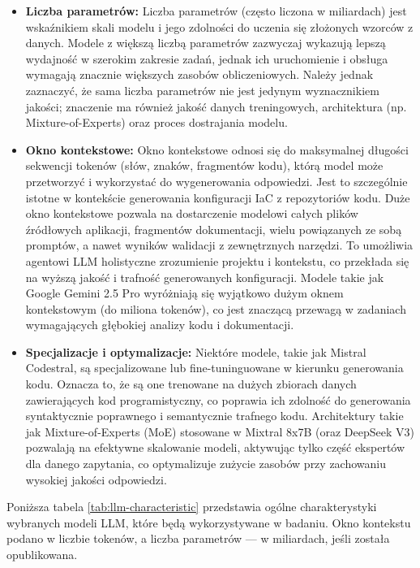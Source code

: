 \begin{itemize}
    \item \textbf{Liczba parametrów:} Liczba parametrów (często liczona w miliardach) jest wskaźnikiem skali modelu i jego zdolności do uczenia się złożonych wzorców z danych. Modele z większą liczbą parametrów zazwyczaj wykazują lepszą wydajność w szerokim zakresie zadań, jednak ich uruchomienie i obsługa wymagają znacznie większych zasobów obliczeniowych. Należy jednak zaznaczyć, że sama liczba parametrów nie jest jedynym wyznacznikiem jakości; znaczenie ma również jakość danych treningowych, architektura (np. Mixture-of-Experts) oraz proces dostrajania modelu.
    \item \textbf{Okno kontekstowe:} Okno kontekstowe odnosi się do maksymalnej długości sekwencji tokenów (słów, znaków, fragmentów kodu), którą model może przetworzyć i wykorzystać do wygenerowania odpowiedzi. Jest to szczególnie istotne w kontekście generowania konfiguracji IaC z repozytoriów kodu. Duże okno kontekstowe pozwala na dostarczenie modelowi całych plików źródłowych aplikacji, fragmentów dokumentacji, wielu powiązanych ze sobą promptów, a nawet wyników walidacji z zewnętrznych narzędzi. To umożliwia agentowi LLM holistyczne zrozumienie projektu i kontekstu, co przekłada się na wyższą jakość i trafność generowanych konfiguracji. Modele takie jak Google Gemini 2.5 Pro wyróżniają się wyjątkowo dużym oknem kontekstowym (do miliona tokenów), co jest znaczącą przewagą w zadaniach wymagających głębokiej analizy kodu i dokumentacji.
    \item \textbf{Specjalizacje i optymalizacje:} Niektóre modele, takie jak Mistral Codestral, są specjalizowane lub fine-tuninguowane w kierunku generowania kodu. Oznacza to, że są one trenowane na dużych zbiorach danych zawierających kod programistyczny, co poprawia ich zdolność do generowania syntaktycznie poprawnego i semantycznie trafnego kodu. Architektury takie jak Mixture-of-Experts (MoE) stosowane w Mixtral 8x7B (oraz DeepSeek V3) pozwalają na efektywne skalowanie modeli, aktywując tylko część ekspertów dla danego zapytania, co optymalizuje zużycie zasobów przy zachowaniu wysokiej jakości odpowiedzi.
\end{itemize}

Poniższa tabela \ref{tab:llm-characteristic} przedstawia ogólne charakterystyki wybranych modeli LLM, które będą wykorzystywane w badaniu. Okno kontekstu podano w liczbie tokenów, a liczba parametrów — w miliardach, jeśli została opublikowana.

